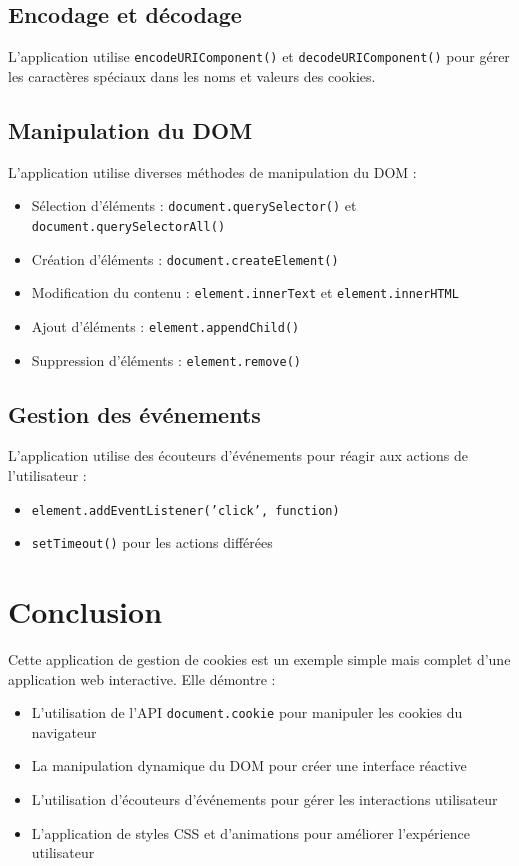 \documentclass{article}
\begin{document}
\subsection{Encodage et décodage}
L'application utilise \texttt{encodeURIComponent()} et \texttt{decodeURIComponent()} pour gérer les caractères spéciaux dans les noms et valeurs des cookies.

\subsection{Manipulation du DOM}
L'application utilise diverses méthodes de manipulation du DOM :
\begin{itemize}
    \item Sélection d'éléments : \texttt{document.querySelector()} et \texttt{document.querySelectorAll()}
    \item Création d'éléments : \texttt{document.createElement()}
    \item Modification du contenu : \texttt{element.innerText} et \texttt{element.innerHTML}
    \item Ajout d'éléments : \texttt{element.appendChild()}
    \item Suppression d'éléments : \texttt{element.remove()}
\end{itemize}

\subsection{Gestion des événements}
L'application utilise des écouteurs d'événements pour réagir aux actions de l'utilisateur :
\begin{itemize}
    \item \texttt{element.addEventListener('click', function)}
    \item \texttt{setTimeout()} pour les actions différées
\end{itemize}

\section{Conclusion}
Cette application de gestion de cookies est un exemple simple mais complet d'une application web interactive. Elle démontre :
\begin{itemize}
    \item L'utilisation de l'API \texttt{document.cookie} pour manipuler les cookies du navigateur
    \item La manipulation dynamique du DOM pour créer une interface réactive
    \item L'utilisation d'écouteurs d'événements pour gérer les interactions utilisateur
    \item L'application de styles CSS et d'animations pour améliorer l'expérience utilisateur
\end{itemize}
\end{document}
